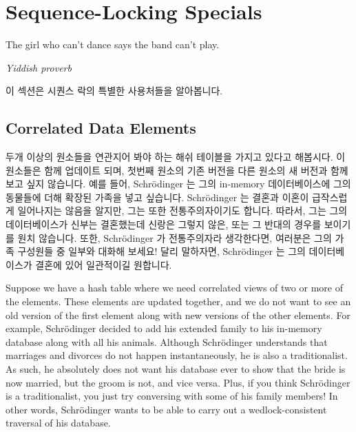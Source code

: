 
\section{Sequence-Locking Specials}
\label{sec:together:Sequence-Locking Specials}
%
\epigraph{The girl who can't dance says the band can't play.}
	 {\emph{Yiddish proverb}}

이 섹션은 시퀀스 락의 특별한 사용처들을 알아봅니다.

\iffalse

This section looks at some special uses of sequence locks.

\fi

\subsection{Correlated Data Elements}
\label{sec:together:Correlated Data Elements}

두개 이상의 원소들을 연관지어 봐야 하는 해쉬 테이블을 가지고 있다고 해봅시다.
이 원소들은 함께 업데이트 되며, 첫번째 원소의 기존 버전을 다른 원소의 새 버전과
함께 보고 싶지 않습니다.
예를 들어, Schr\"odinger 는 그의 in-memory 데이터베이스에 그의 동물들에 더해
확장된 가족을 넣고 싶습니다.
Schr\"odinger 는 결혼과 이혼이 급작스럽게 일어나지는 않음을 알지만, 그는 또한
전통주의자이기도 합니다.
따라서, 그는 그의 데이터베이스가 신부는 결혼했는데 신랑은 그렇지 않은, 또는 그
반대의 경우를 보이기를 원치 않습니다.
또한, Schr\"odinger 가 전통주의자라 생각한다면, 여러분은 그의 가족 구성원들 중
일부와 대화해 보세요!
달리 말하자면, Schr\"odinger 는 그의 데이터베이스가 결혼에 있어 일관적이길
원합니다.

\iffalse

Suppose we have a hash table where we need correlated views of two or
more of the elements.
These elements are updated together, and we do not want to see an old
version of the first element along with new versions of the other
elements.
For example, Schr\"odinger decided to add his extended family to his
in-memory database along with all his animals.
Although Schr\"odinger understands that marriages and divorces do not
happen instantaneously, he is also a traditionalist.
As such, he absolutely does not want his database ever to show that the
bride is now married, but the groom is not, and vice versa.
Plus, if you think Schr\"odinger is a traditionalist, you just
try conversing with some of his family members!
In other words, Schr\"odinger wants to be able to carry out a
wedlock-consistent traversal of his database.

